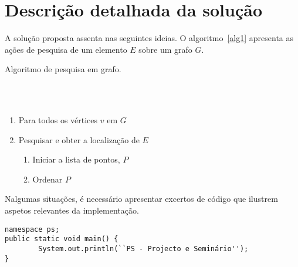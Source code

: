 \section{Descrição detalhada da solução} \label{sec33}
A solução proposta assenta nas seguintes ideias. O algoritmo~\ref{alg1}
apresenta as ações de pesquisa de um elemento $E$ sobre um grafo $G$.
\begin{algorithm}
\caption{Algoritmo de pesquisa em grafo.}
\label{alg1}
\\
\\
\begin{enumerate}
\item Para todos os vértices $v$ em $G$
\item Pesquisar e obter a localização de $E$
\begin{enumerate}
	\item Iniciar a lista de pontos, $P$
	\item Ordenar $P$
\end{enumerate}	
\end{enumerate}
\end{algorithm}

\newpage
Nalgumas situações, é necessário apresentar excertos de
código que ilustrem aspetos relevantes da implementação.

\begin{verbatim}
namespace ps;
public static void main() {
		System.out.println(``PS - Projecto e Seminário'');
}
\end{verbatim}